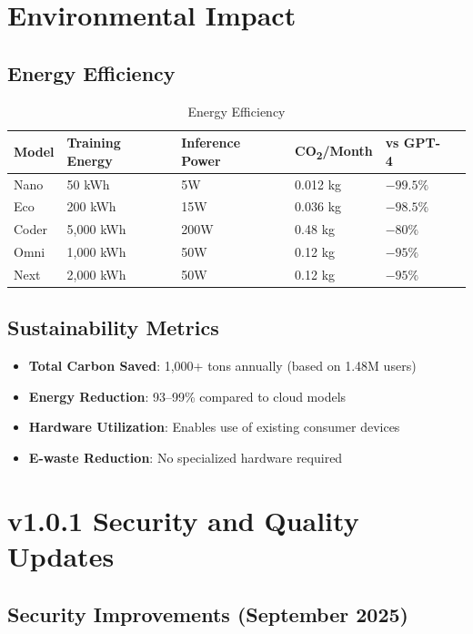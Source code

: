 \documentclass[11pt,a4paper]{article}
\begin{document}
\section{Environmental Impact}

\subsection{Energy Efficiency}

\begin{table}[H]
\centering
\begin{tabular}{llllll}
\toprule
\textbf{Model} & \textbf{Training Energy} & \textbf{Inference Power} & \textbf{CO\textsubscript{2}/Month} & \textbf{vs GPT-4} \\
\midrule
Nano & 50 kWh & 5W & 0.012 kg & $-99.5\%$ \\
Eco & 200 kWh & 15W & 0.036 kg & $-98.5\%$ \\
Coder & 5,000 kWh & 200W & 0.48 kg & $-80\%$ \\
Omni & 1,000 kWh & 50W & 0.12 kg & $-95\%$ \\
Next & 2,000 kWh & 50W & 0.12 kg & $-95\%$ \\
\bottomrule
\end{tabular}
\caption{Energy Efficiency}
\end{table}

\subsection{Sustainability Metrics}

\begin{itemize}
    \item \textbf{Total Carbon Saved}: 1,000+ tons annually (based on 1.48M users)
    \item \textbf{Energy Reduction}: 93--99\% compared to cloud models
    \item \textbf{Hardware Utilization}: Enables use of existing consumer devices
    \item \textbf{E-waste Reduction}: No specialized hardware required
\end{itemize}

\section{v1.0.1 Security and Quality Updates}

\subsection{Security Improvements (September 2025)}
\end{document}
